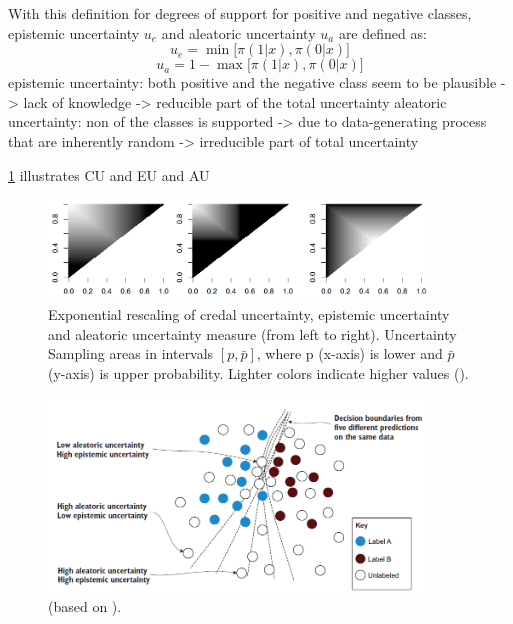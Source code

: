 With this definition for degrees of support for positive and negative classes, epistemic uncertainty $u_e$ and aleatoric uncertainty $u_a$ are defined as:
\begin{equation}
u_e = \min \bigg[ \pi(1 | x), \pi(0 | x) \bigg]
\end{equation}
\begin{equation}
u_a = 1 - \max \bigg[ \pi(1 | x), \pi(0 | x) \bigg]
\end{equation}
epistemic uncertainty: both positive and the negative class seem to be plausible -> lack of knowledge -> reducible part of the total uncertainty
aleatoric uncertainty: non of the classes is supported -> due to data-generating process that are inherently random -> irreducible part of total uncertainty


\ref{fig:uncertainty_measures} illustrates \ac{CU} and \ac{EU} and \ac{AU}

\begin{figure}[t]
  \centering
    \includegraphics[width=0.90\textwidth]{figures/uncertainty_measures.PNG}
  \caption{Exponential rescaling of credal uncertainty, epistemic uncertainty and aleatoric uncertainty measure (from left to right). 
  Uncertainty Sampling areas in intervals $[p, \bar{p}]$, where p (x-axis) is lower and $\bar{p}$ (y-axis) is upper probability. Lighter colors indicate higher values (\cite{nguyen2021howtomeasure}).}
  \label{fig:uncertainty_measures}
\end{figure}



\begin{figure}[t]
  \centering
    \includegraphics[width=0.90\textwidth]{figures/uncertainty_differences.PNG}
  \caption{ (based on \cite{human-in-the-loop}).}
  \label{fig:uncertainty_differences}
\end{figure}




